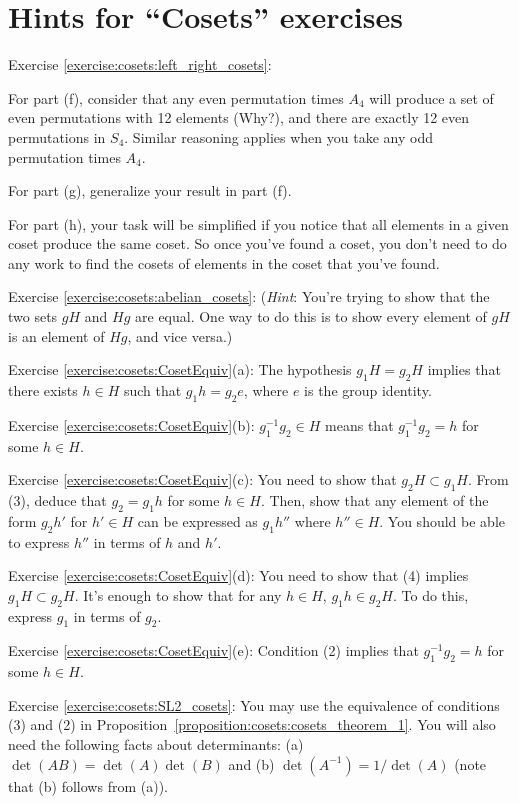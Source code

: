 \section{Hints for ``Cosets'' exercises}\label{sec:cosets:hints} 

\noindent Exercise \ref{exercise:cosets:left_right_cosets}: 

For part (f), consider that any even permutation times $A_4$ will produce a set of even permutations with 12 elements (Why?), and there are exactly 12 even permutations in $S_4$.  Similar reasoning applies when you take any odd permutation times $A_4$.

For part (g), generalize your result in part (f).

For part (h), your task will be simplified if you notice that all elements in a given coset produce the same coset. So once you've found a coset, you don't need to do any work to find the cosets of elements in the coset that you've found.


\noindent Exercise \ref{exercise:cosets:abelian_cosets}:  (\emph{Hint}: You're trying to show that the two sets $gH$ and $Hg$ are equal. One way to do this is to show every element of $gH$ is an element of $Hg$, and vice versa.)


\noindent Exercise \ref{exercise:cosets:CosetEquiv}(a): The hypothesis $g_1 H = g_2 H$ implies that there exists $h \in H$ such that $g_1 h  = g_2 e$, where $e$ is the group identity. 

\noindent Exercise \ref{exercise:cosets:CosetEquiv}(b):   $g_1^{-1} g_2 \in H$ means that $g_1^{-1} g_2 = h$ for some $h \in H$. 

\noindent Exercise \ref{exercise:cosets:CosetEquiv}(c):   You need to show that $g_2 H \subset g_1 H$. From (3), deduce that $g_2 = g_1 h$ for some $h \in H$. Then, show that any element of the form $g_2 h'$ for $h' \in H$ can be expressed as $g_1 h''$ where $h'' \in H$. You should be able to express $h''$ in terms of $h$ and $h'$.

\noindent Exercise \ref{exercise:cosets:CosetEquiv}(d):   You need to show that (4) implies $g_1H \subset g_2H$. It's enough to show that for any $h \in H$,  $g_1 h \in g_2 H$. To do this, express $g_1$ in terms of $g_2$. 

\noindent Exercise \ref{exercise:cosets:CosetEquiv}(e):    Condition (2) implies that $g_1^{-1} g_2 = h$ for some $h \in H$.

\noindent Exercise \ref{exercise:cosets:SL2_cosets}:  You may use the equivalence of conditions (3) and (2) in Proposition~\ref{proposition:cosets:cosets_theorem_1}.  You will also need the following facts about determinants:  (a) $\det(AB) = \det(A)\det(B)$ and (b) $\det(A^{-1}) = 1/\det(A)$  (note that (b) follows from (a)).

